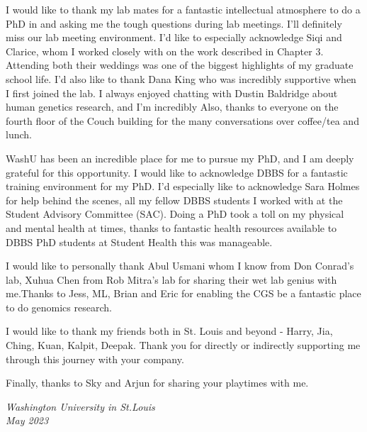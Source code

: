I would like to thank my lab mates for a fantastic intellectual atmosphere to do a PhD in and asking me the tough questions during lab meetings. I'll definitely miss our lab meeting environment. I'd like to especially acknowledge Siqi and Clarice, whom I worked closely with on the work described in Chapter 3. Attending both their weddings was one of the biggest highlights of my graduate school life. I'd also like to thank Dana King who was incredibly supportive when I first joined the lab. I always enjoyed chatting with Dustin Baldridge about human genetics research, and I'm incredibly  Also, thanks to everyone on the fourth floor of the Couch building for the many conversations over coffee/tea and lunch.

WashU has been an incredible place for me to pursue my PhD, and I am deeply grateful for this opportunity. I would like to acknowledge DBBS for a fantastic training environment for my PhD.  I'd especially like to acknowledge Sara Holmes for help behind the scenes, all my fellow DBBS students I worked with at the Student Advisory Committee (SAC). Doing a PhD took a toll on my physical and mental health at times, thanks to fantastic health resources available to DBBS PhD students at Student Health this was manageable. 

I would like to personally thank Abul Usmani whom I know from Don Conrad's lab, Xuhua Chen from Rob Mitra's lab for sharing their wet lab genius with me.Thanks to Jess, ML, Brian and Eric for enabling the CGS be a fantastic place to do genomics research.

I would like to thank my friends both in St. Louis and beyond - Harry, Jia, Ching, Kuan, Kalpit, Deepak. Thank you for directly or indirectly supporting me through this journey with your company.

Finally, thanks to Sky and Arjun for sharing your playtimes with me.

\null\hfill \thesisauthor

\noindent
\textit{Washington University in St.\@ Louis}\\
\textit{May 2023}
